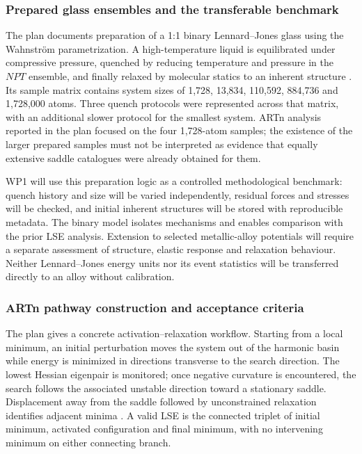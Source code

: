\documentclass[11pt,a4paper]{article}
\begin{document}
\subsubsection{Prepared glass ensembles and the transferable benchmark}
The plan documents preparation of a 1:1 binary Lennard--Jones glass using the Wahnstr\"om parametrization. A high-temperature liquid is equilibrated under compressive pressure, quenched by reducing temperature and pressure in the $NPT$ ensemble, and finally relaxed by molecular statics to an inherent structure \cite{swayplan}. Its sample matrix contains system sizes of 1,728, 13,834, 110,592, 884,736 and 1,728,000 atoms. Three quench protocols were represented across that matrix, with an additional slower protocol for the smallest system. ARTn analysis reported in the plan focused on the four 1,728-atom samples; the existence of the larger prepared samples must not be interpreted as evidence that equally extensive saddle catalogues were already obtained for them.

WP1 will use this preparation logic as a controlled methodological benchmark: quench history and size will be varied independently, residual forces and stresses will be checked, and initial inherent structures will be stored with reproducible metadata. The binary model isolates mechanisms and enables comparison with the prior LSE analysis. Extension to selected metallic-alloy potentials will require a separate assessment of structure, elastic response and relaxation behaviour. Neither Lennard--Jones energy units nor its event statistics will be transferred directly to an alloy without calibration.

\subsubsection{ARTn pathway construction and acceptance criteria}
The plan gives a concrete activation--relaxation workflow. Starting from a local minimum, an initial perturbation moves the system out of the harmonic basin while energy is minimized in directions transverse to the search direction. The lowest Hessian eigenpair is monitored; once negative curvature is encountered, the search follows the associated unstable direction toward a stationary saddle. Displacement away from the saddle followed by unconstrained relaxation identifies adjacent minima \cite{swayplan}. A valid LSE is the connected triplet of initial minimum, activated configuration and final minimum, with no intervening minimum on either connecting branch.
\end{document}
